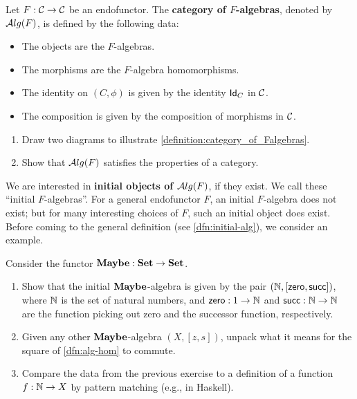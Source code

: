 \begin{dfn}\label{definition:category_of_Falgebras} Let $F:\CC\to \CC$ be an endofunctor. The \textbf{category of $F$-algebras}, denoted by $\ALG{F}$, is defined by the following data:
\begin{itemize}
\item The objects are the $F$-algebras.
\item The morphisms are the $F$-algebra homomorphisms.
\item The identity on $(C,\phi)$ is given by the identity $\Id[C]$ in $\CC$.
\item The composition is given by the composition of morphisms in $\CC$.
\end{itemize}
\end{dfn}

\begin{exer}
  \begin{enumerate}
  \item Draw two diagrams to illustrate \cref{definition:category_of_Falgebras}.
  \item Show that $\ALG{F}$ satisfies the properties of a category.
  \end{enumerate}
\end{exer}

We are interested in \textbf{initial objects of $\ALG{F}$}, if they exist.
We call these ``initial $F$-algebras''.
For a general endofunctor $F$, an initial $F$-algebra does not exist;
but for many interesting choices of $F$, such an initial object does exist.
Before coming to the general definition (see \cref{dfn:initial-alg}),
we consider an example.


\begin{exer}
  Consider the functor $\Maybe : \SET \to \SET$.
  \begin{enumerate}
  \item Show that the initial $\Maybe$-algebra is given by the pair $(\NN, [\Zero,\Succ])$, 
    where $\NN$ is the set of natural numbers, and $\Zero : 1 \to \NN$ and $\Succ : \NN\to\NN$ 
    are the function picking out zero and the successor function, respectively.
  \item Given any other $\Maybe$-algebra $(X,[z,s])$, unpack what it means for the square of \cref{dfn:alg-hom} to commute.
  \item Compare the data from the previous exercise to a definition of a function $f : \NN \to X$ by pattern matching (e.g., in Haskell).
  \end{enumerate}
\end{exer}

